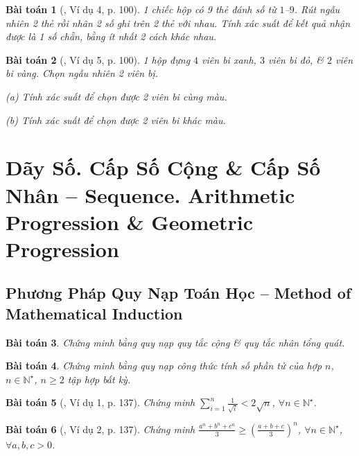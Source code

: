 \documentclass{article}
\numberwithin{equation}{section}
\newtheorem{baitoan}{Bài toán}[section]
\begin{document}
\begin{baitoan}[\cite{TL_chuyen_Toan_Dai_So_Giai_Tich_11}, Ví dụ 4, p. 100]
	1 chiếc hộp có 9 thẻ đánh số từ $1$--$9$. Rút ngẫu nhiên 2 thẻ rồi nhân 2 số ghi trên 2 thẻ với nhau. Tính xác suất để kết quả nhận được là 1 số chẵn, bằng ít nhất 2 cách khác nhau.
\end{baitoan}

\begin{baitoan}[\cite{TL_chuyen_Toan_Dai_So_Giai_Tich_11}, Ví dụ 5, p. 100]
	1 hộp đựng $4$ viên bi xanh, $3$ viên bi đỏ, \& $2$ viên bi vàng. Chọn ngẫu nhiên 2 viên bị.
	\begin{enumerate*}
		\item[(a)] Tính xác suất để chọn được 2 viên bi cùng màu.
		\item[(b)] Tính xác suất để chọn được 2 viên bi khác màu.
	\end{enumerate*}
\end{baitoan}


\section{Dãy Số. Cấp Số Cộng \& Cấp Số Nhân -- Sequence. Arithmetic Progression \& Geometric Progression}

\subsection{Phương Pháp Quy Nạp Toán Học -- Method of Mathematical Induction}

\begin{baitoan}
	Chứng minh bằng quy nạp quy tắc cộng \& quy tắc nhân tổng quát.
\end{baitoan}

\begin{baitoan}
	Chứng minh bằng quy nạp công thức tính số phần tử của hợp $n$, $n\in\mathbb{N}^\star$, $n\ge 2$ tập hợp bất kỳ.
\end{baitoan}

\begin{baitoan}[\cite{TL_chuyen_Toan_Giai_Tich_12}, Ví dụ 1, p. 137]
	Chứng minh $\sum_{i=1}^n \frac{1}{\sqrt{i}} < 2\sqrt{n}$, $\forall n\in\mathbb{N}^\star$.
\end{baitoan}

\begin{baitoan}[\cite{TL_chuyen_Toan_Giai_Tich_12}, Ví dụ 2, p. 137]
	Chứng minh $\frac{a^n + b^n + c^n}{3}\ge\left(\frac{a + b + c}{3}\right)^n$, $\forall n\in\mathbb{N}^\star$, $\forall a,b,c > 0$.
\end{baitoan}
\end{document}
